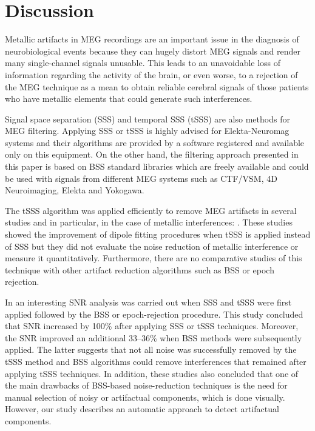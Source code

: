 \section{Discussion}

Metallic artifacts in MEG recordings are an important issue in the diagnosis of neurobiological events because they can hugely distort MEG signals and render many single-channel signals unusable. This leads to an unavoidable loss of information regarding the activity of the brain, or even worse, to a rejection of the MEG technique as a mean to obtain reliable cerebral signals of those patients who have metallic elements that could generate such interferences.

Signal space separation (SSS) \citep{Taulu2004} and temporal SSS (tSSS) \citep{Taulu2006} are also methods for MEG filtering. Applying SSS or tSSS is highly advised for Elekta-Neuromag systems \citep{GonzalezMoreno2014} and their algorithms are provided by a software registered and available only on this equipment. On the other hand, the filtering approach presented in this paper is based on BSS standard libraries which are freely available and could be used with signals from different MEG systems such as CTF/VSM, 4D Neuroimaging, Elekta and Yokogawa.

The tSSS algorithm was applied efficiently to remove MEG artifacts in several studies \citep{GonzalezMoreno2014,Nenonen2012,Taulu2009} and in particular, in the case of metallic interferences: \citep{Hillebrand2013,Cheyne2007,Taulu2006}. These studies showed the improvement of dipole fitting procedures when tSSS is applied instead of SSS but they did not evaluate the noise reduction of metallic interference or measure it quantitatively. Furthermore, there are no comparative studies of this technique with other artifact reduction algorithms such as BSS or epoch rejection.

In \citep{GonzalezMoreno2014} an interesting SNR analysis was carried out when SSS and tSSS were first applied followed by the BSS or epoch-rejection procedure. This study concluded that SNR increased by 100\% after applying SSS or tSSS techniques. Moreover, the SNR improved an additional 33–36\% when BSS methods were subsequently applied. The latter suggests that not all noise was successfully removed by the tSSS method and BSS algorithms could remove interferences that remained after applying tSSS techniques. In addition, these studies also concluded that one of the main drawbacks of BSS-based noise-reduction techniques is the need for manual selection of noisy or artifactual components, which is done visually. However, our study describes an automatic approach to detect artifactual components.

